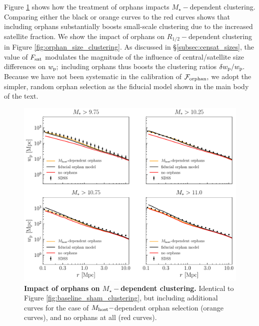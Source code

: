 \documentclass[usenatbib,usegraphicx,letterpaper]{mn2e}
\newcommand{\rhalf}{R_{1/2}}
\newcommand{\mstar}{M_{\star}}
\newcommand{\fsat}{F_{\rm sat}}
\newcommand{\wproj}{w_{\rm p}}
\begin{document}
Figure \ref{fig:orphan_baseline_clustering} shows how the treatment of orphans impacts $\mstar-$dependent clustering. Comparing either the black or orange curves to the red curves shows that including orphans substantially boosts small-scale clustering due to the increased satellite fraction. We show the impact of orphans on $\rhalf-$dependent clustering in Figure \ref{fig:orphan_size_clustering}. As discussed in \S\ref{subsec:censat_sizes}, the value of $\fsat$ modulates the magnitude of the influence of central/satellite size differences on $\wproj;$ including orphans thus boosts the clustering ratios $\delta\wproj/\wproj.$ Because we have not been systematic in the calibration of $\mathcal{F}_{\rm orphan},$ we adopt the simpler, random orphan selection as the fiducial model shown in the main body of the text.



\begin{figure}
\centering
\includegraphics[width=12cm]{FIGS/baseline_sham_orphans.pdf}
\caption{
{\bf Impact of orphans on $\mstar-$dependent clustering.}
Identical to Figure \ref{fig:baseline_sham_clustering}, but including additional curves for the case of $M_{\rm host}-$dependent orphan selection (orange curves), and no orphans at all (red curves).
}
\label{fig:orphan_baseline_clustering}
\end{figure}
\end{document}
